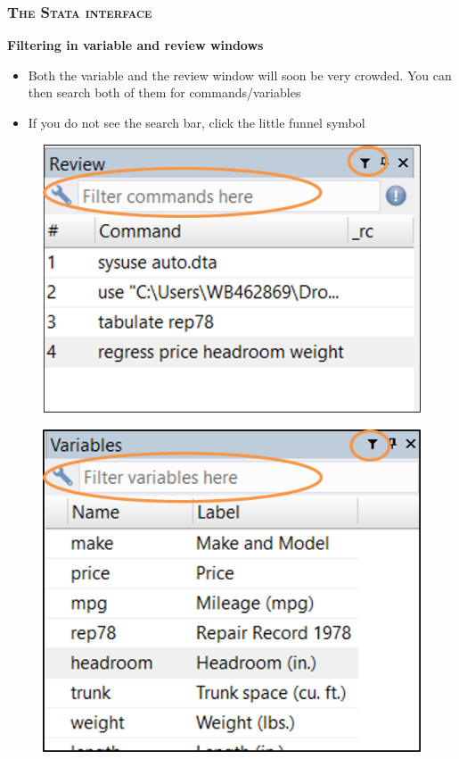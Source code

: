\documentclass[10pt]{beamer}
\begin{document}
	\begin{frame}
		\frametitle{\textsc{The Stata interface}}
		\begin{center}
			\textbf{Filtering in variable and review windows} 
		\end{center}
	\begin{minipage}{0.45\linewidth}
		\begin{itemize}
			\item  Both the variable and the review window will soon be very crowded. You can then search both of them for commands/variables
			
			\item  If you do not see the search bar, click the little funnel symbol
			
			
		\end{itemize}
	\end{minipage}
 	\hfill
	\begin{minipage}{0.45\linewidth}
		\begin{figure}[H] 
			\centering
			\includegraphics[width=0.75\linewidth]{review_window}
		\end{figure}
		\begin{figure}[H] 
			\centering
			\includegraphics[width=0.75\linewidth]{variable_window}
		\end{figure}
	\end{minipage}
	\end{frame}
\end{document}
